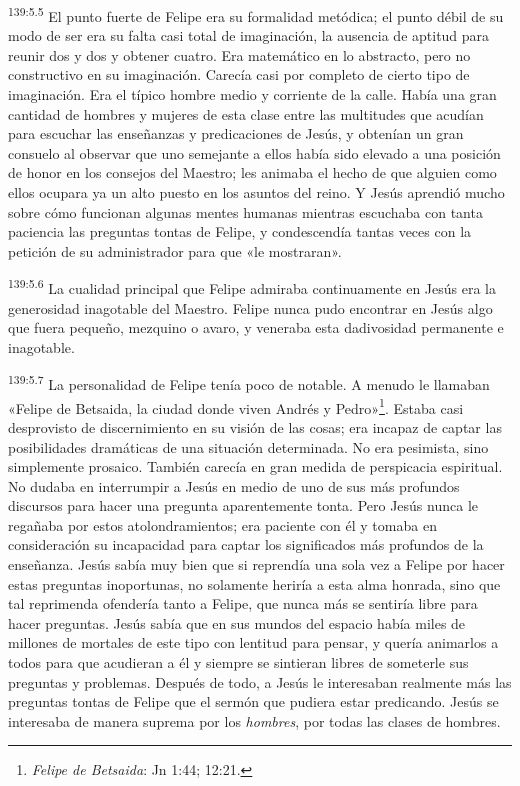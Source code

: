 \par 
\textsuperscript{139:5.5} El punto fuerte de Felipe era su formalidad metódica; el punto débil de su modo de ser era su falta casi total de imaginación, la ausencia de aptitud para reunir dos y dos y obtener cuatro. Era matemático en lo abstracto, pero no constructivo en su imaginación. Carecía casi por completo de cierto tipo de imaginación. Era el típico hombre medio y corriente de la calle. Había una gran cantidad de hombres y mujeres de esta clase entre las multitudes que acudían para escuchar las enseñanzas y predicaciones de Jesús, y obtenían un gran consuelo al observar que uno semejante a ellos había sido elevado a una posición de honor en los consejos del Maestro; les animaba el hecho de que alguien como ellos ocupara ya un alto puesto en los asuntos del reino. Y Jesús aprendió mucho sobre cómo funcionan algunas mentes humanas mientras escuchaba con tanta paciencia las preguntas tontas de Felipe, y condescendía tantas veces con la petición de su administrador para que «le mostraran».

\par 
\textsuperscript{139:5.6} La cualidad principal que Felipe admiraba continuamente en Jesús era la generosidad inagotable del Maestro. Felipe nunca pudo encontrar en Jesús algo que fuera pequeño, mezquino o avaro, y veneraba esta dadivosidad permanente e inagotable.

\par 
\textsuperscript{139:5.7} La personalidad de Felipe tenía poco de notable. A menudo le llamaban «Felipe de Betsaida, la ciudad donde viven Andrés y Pedro»\footnote{\textit{Felipe de Betsaida}: Jn 1:44; 12:21.}. Estaba casi desprovisto de discernimiento en su visión de las cosas; era incapaz de captar las posibilidades dramáticas de una situación determinada. No era pesimista, sino simplemente prosaico. También carecía en gran medida de perspicacia espiritual. No dudaba en interrumpir a Jesús en medio de uno de sus más profundos discursos para hacer una pregunta aparentemente tonta. Pero Jesús nunca le regañaba por estos atolondramientos; era paciente con él y tomaba en consideración su incapacidad para captar los significados más profundos de la enseñanza. Jesús sabía muy bien que si reprendía una sola vez a Felipe por hacer estas preguntas inoportunas, no solamente heriría a esta alma honrada, sino que tal reprimenda ofendería tanto a Felipe, que nunca más se sentiría libre para hacer preguntas. Jesús sabía que en sus mundos del espacio había miles de millones de mortales de este tipo con lentitud para pensar, y quería animarlos a todos para que acudieran a él y siempre se sintieran libres de someterle sus preguntas y problemas. Después de todo, a Jesús le interesaban realmente más las preguntas tontas de Felipe que el sermón que pudiera estar predicando. Jesús se interesaba de manera suprema por los \textit{hombres}, por todas las clases de hombres.

